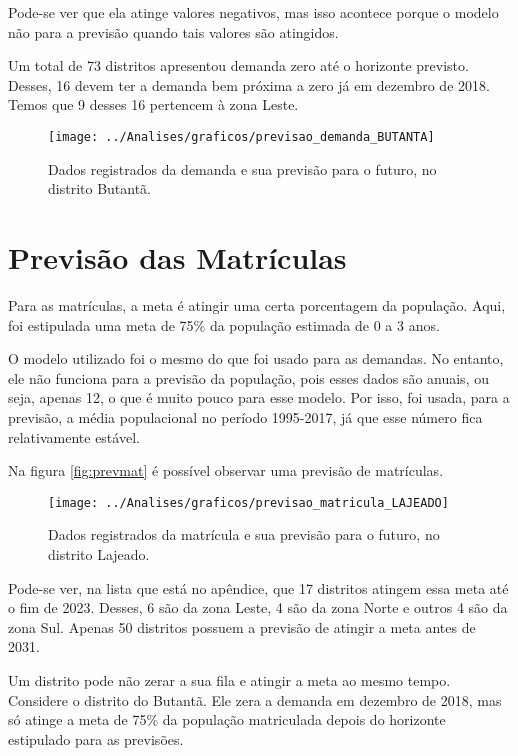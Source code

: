 Pode-se ver que ela atinge valores negativos, mas isso acontece porque o modelo não para a previsão quando tais valores são atingidos.

Um total de 73 distritos apresentou demanda zero até o horizonte previsto. Desses, 16 devem ter a demanda bem próxima a zero já em dezembro de 2018. Temos que 9 desses 16 pertencem à zona Leste.

\begin{figure}[H]
	\centering
	\texttt{[image: ../Analises/graficos/previsao\_demanda\_BUTANTA]}
	\caption{Dados registrados da demanda e sua previsão para o futuro, no distrito Butantã.}
	\label{fig:prevdem}
\end{figure}

\section{Previsão das Matrículas}

Para as matrículas, a meta é atingir uma certa porcentagem da população. Aqui, foi estipulada uma meta de 75\% da população estimada de 0 a 3 anos. 

O modelo utilizado foi o mesmo do que foi usado para as demandas. No entanto, ele não funciona para a previsão da população, pois esses dados são anuais, ou seja, apenas 12, o que é muito pouco para esse modelo. Por isso, foi usada, para a previsão, a média populacional no período 1995-2017, já que esse número fica relativamente estável.

Na figura \autoref{fig:prevmat} é possível observar uma previsão de matrículas.

\begin{figure}[H]
	\centering
	\texttt{[image: ../Analises/graficos/previsao\_matricula\_LAJEADO]}
	\caption{Dados registrados da matrícula e sua previsão para o futuro, no distrito Lajeado.}
	\label{fig:prevmat}
\end{figure}

Pode-se ver, na lista que está no apêndice, que 17 distritos atingem essa meta até o fim de 2023. Desses, 6 são da zona Leste, 4 são da zona Norte e outros 4 são da zona Sul. Apenas 50 distritos possuem a previsão de atingir a meta antes de 2031.

Um distrito pode não zerar a sua fila e atingir a meta ao mesmo tempo. Considere o distrito do Butantã. Ele zera a demanda em dezembro de 2018, mas só atinge a meta de 75\% da população matriculada depois do horizonte estipulado para as previsões.